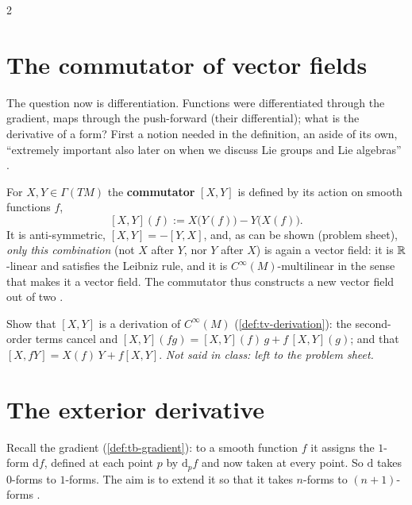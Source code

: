 \begin{paracol}{2}
\section{The commutator of vector fields}\label{sec:gr-commutator}

The question now is differentiation. Functions were differentiated through the gradient, maps through the push-forward (their differential); what is the derivative of a form? First a notion needed in the definition, an aside of its own, ``extremely important also later on when we discuss Lie groups and Lie algebras''     .
\begin{definition}\label{def:gr-commutator}
For $X,Y\in\Gamma(TM)$ the \textbf{commutator} $[X,Y]$ is defined by its action on smooth functions $f$,
\[
  [X,Y](f):=X\bigl(Y(f)\bigr)-Y\bigl(X(f)\bigr).
\]
It is anti-symmetric, $[X,Y]=-[Y,X]$, and, as can be shown (problem sheet), \emph{only this combination} (not $X$ after $Y$, nor $Y$ after $X$) is again a vector field: it is $\mathbb{R}$-linear and satisfies the Leibniz rule, and it is $C^\infty(M)$-multilinear in the sense that makes it a vector field. The commutator thus constructs a new vector field out of two
   .
\end{definition}
\begin{exercise}\label{ex:gr-comm}
Show that $[X,Y]$ is a derivation of $C^\infty(M)$ (\cref{def:tv-derivation}): the second-order terms cancel and $[X,Y](fg)=[X,Y](f)\,g+f\,[X,Y](g)$; and that $[X,fY]=X(f)\,Y+f[X,Y]$. \emph{Not said in class: left to the problem sheet.}
\end{exercise}

\section{The exterior derivative}\label{sec:gr-d}

Recall the gradient (\cref{def:tb-gradient}): to a smooth function $f$ it assigns the $1$-form $\mathrm df$, defined at each point $p$ by $\mathrm d_pf$ and now taken at every point. So $\mathrm d$ takes $0$-forms to $1$-forms. The aim is to extend it so that it takes $n$-forms to $(n+1)$-forms      .


\end{paracol}
